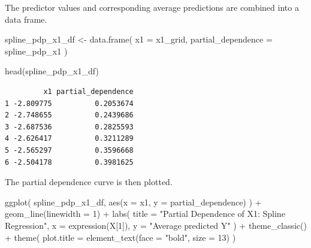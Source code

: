 \documentclass[
  letterpaper,
  DIV=11,
  numbers=noendperiod]{scrreprt}
\newenvironment{Shaded}{\begin{snugshade}}{\end{snugshade}}
\newcommand{\AttributeTok}[1]{\textcolor[rgb]{0.40,0.45,0.13}{#1}}
\newcommand{\ControlFlowTok}[1]{\textcolor[rgb]{0.00,0.23,0.31}{\textbf{#1}}}
\newcommand{\DecValTok}[1]{\textcolor[rgb]{0.68,0.00,0.00}{#1}}
\newcommand{\FunctionTok}[1]{\textcolor[rgb]{0.28,0.35,0.67}{#1}}
\newcommand{\NormalTok}[1]{\textcolor[rgb]{0.00,0.23,0.31}{#1}}
\newcommand{\OtherTok}[1]{\textcolor[rgb]{0.00,0.23,0.31}{#1}}
\newcommand{\SpecialCharTok}[1]{\textcolor[rgb]{0.37,0.37,0.37}{#1}}
\newcommand{\StringTok}[1]{\textcolor[rgb]{0.13,0.47,0.30}{#1}}
\begin{document}
\begin{Shaded}
\end{Shaded}

The predictor values and corresponding average predictions are combined
into a data frame.

\begin{Shaded}
\begin{Highlighting}[]
\NormalTok{spline\_pdp\_x1\_df }\OtherTok{\textless{}{-}} \FunctionTok{data.frame}\NormalTok{(}
  \AttributeTok{x1 =}\NormalTok{ x1\_grid,}
  \AttributeTok{partial\_dependence =}\NormalTok{ spline\_pdp\_x1}
\NormalTok{)}

\FunctionTok{head}\NormalTok{(spline\_pdp\_x1\_df)}
\end{Highlighting}
\end{Shaded}

\begin{verbatim}
         x1 partial_dependence
1 -2.809775          0.2053674
2 -2.748655          0.2439686
3 -2.687536          0.2825593
4 -2.626417          0.3211289
5 -2.565297          0.3596668
6 -2.504178          0.3981625
\end{verbatim}

The partial dependence curve is then plotted.

\begin{Shaded}
\begin{Highlighting}[]
\FunctionTok{ggplot}\NormalTok{(}
\NormalTok{  spline\_pdp\_x1\_df,}
  \FunctionTok{aes}\NormalTok{(}\AttributeTok{x =}\NormalTok{ x1, }\AttributeTok{y =}\NormalTok{ partial\_dependence)}
\NormalTok{) }\SpecialCharTok{+}
  \FunctionTok{geom\_line}\NormalTok{(}\AttributeTok{linewidth =} \DecValTok{1}\NormalTok{) }\SpecialCharTok{+}
  \FunctionTok{labs}\NormalTok{(}
    \AttributeTok{title =} \StringTok{"Partial Dependence of X1: Spline Regression"}\NormalTok{,}
    \AttributeTok{x =} \FunctionTok{expression}\NormalTok{(X[}\DecValTok{1}\NormalTok{]),}
    \AttributeTok{y =} \StringTok{"Average predicted Y"}
\NormalTok{  ) }\SpecialCharTok{+}
  \FunctionTok{theme\_classic}\NormalTok{() }\SpecialCharTok{+}
  \FunctionTok{theme}\NormalTok{(}
    \AttributeTok{plot.title =} \FunctionTok{element\_text}\NormalTok{(}\AttributeTok{face =} \StringTok{"bold"}\NormalTok{, }\AttributeTok{size =} \DecValTok{13}\NormalTok{)}
\NormalTok{  )}
\end{Highlighting}
\end{Shaded}
\end{document}
